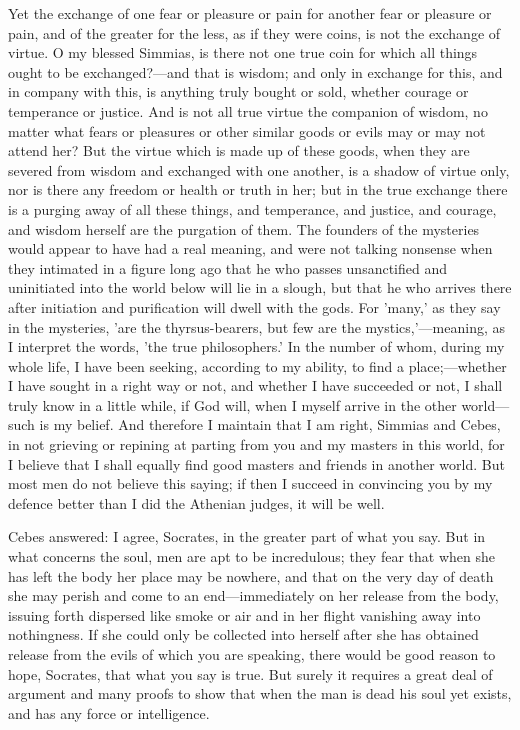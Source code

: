 \documentclass[11pt,letter]{article}
\begin{document}
\par  Yet the exchange of one fear or pleasure or pain for another fear or pleasure or pain, and of the greater for the less, as if they were coins, is not the exchange of virtue. O my blessed Simmias, is there not one true coin for which all things ought to be exchanged?—and that is wisdom; and only in exchange for this, and in company with this, is anything truly bought or sold, whether courage or temperance or justice. And is not all true virtue the companion of wisdom, no matter what fears or pleasures or other similar goods or evils may or may not attend her? But the virtue which is made up of these goods, when they are severed from wisdom and exchanged with one another, is a shadow of virtue only, nor is there any freedom or health or truth in her; but in the true exchange there is a purging away of all these things, and temperance, and justice, and courage, and wisdom herself are the purgation of them. The founders of the mysteries would appear to have had a real meaning, and were not talking nonsense when they intimated in a figure long ago that he who passes unsanctified and uninitiated into the world below will lie in a slough, but that he who arrives there after initiation and purification will dwell with the gods. For 'many,' as they say in the mysteries, 'are the thyrsus-bearers, but few are the mystics,'—meaning, as I interpret the words, 'the true philosophers.' In the number of whom, during my whole life, I have been seeking, according to my ability, to find a place;—whether I have sought in a right way or not, and whether I have succeeded or not, I shall truly know in a little while, if God will, when I myself arrive in the other world—such is my belief. And therefore I maintain that I am right, Simmias and Cebes, in not grieving or repining at parting from you and my masters in this world, for I believe that I shall equally find good masters and friends in another world. But most men do not believe this saying; if then I succeed in convincing you by my defence better than I did the Athenian judges, it will be well.

\par  Cebes answered: I agree, Socrates, in the greater part of what you say. But in what concerns the soul, men are apt to be incredulous; they fear that when she has left the body her place may be nowhere, and that on the very day of death she may perish and come to an end—immediately on her release from the body, issuing forth dispersed like smoke or air and in her flight vanishing away into nothingness. If she could only be collected into herself after she has obtained release from the evils of which you are speaking, there would be good reason to hope, Socrates, that what you say is true. But surely it requires a great deal of argument and many proofs to show that when the man is dead his soul yet exists, and has any force or intelligence.
\end{document}
